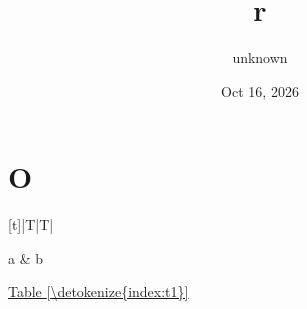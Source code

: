 \documentclass[letterpaper,10pt,english]{sphinxmanual}
\title{r}
\date{Oct 16, 2026}
\author{unknown}
\begin{document}
\pagestyle{empty}
\sphinxmaketitle
\pagestyle{plain}
\sphinxtableofcontents
\pagestyle{normal}
\label{\detokenize{index::doc}}



\chapter{O}
\label{\detokenize{other:o}}\label{\detokenize{other::doc}}

\begin{savenotes}\sphinxattablestart
\centering
{}
\sphinxthecaptionisattop
{}\label{\detokenize{index:t1}}
\sphinxaftertopcaption
\begin{tabulary}{\linewidth}[t]{|T|T|}
\hline

a
&
b
\\
\hline
\end{tabulary}
\par
\sphinxattableend\end{savenotes}

\hyperref[\detokenize{index:t1}]{Table \ref{\detokenize{index:t1}}}



\renewcommand{\indexname}{Index}
\printindex
\end{document}
